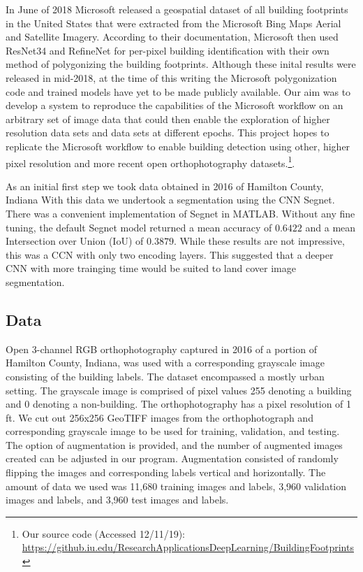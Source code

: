 \documentclass[acmtog, authorversion]{acmart}
\begin{document}
In June of 2018 Microsoft released a geospatial dataset of all building footprints in the United States that were extracted from the Microsoft Bing Maps Aerial and Satellite Imagery\cite{Microsoft2019}. According to their documentation, Microsoft then used ResNet34 and RefineNet for per-pixel building identification with their own method of polygonizing the building footprints. Although these inital results were released in mid-2018, at the time of this writing the Microsoft polygonization code and trained models have yet to be made publicly available. Our aim was to develop a system to reproduce the capabilities of the Microsoft workflow on an arbitrary set of image data that could then enable the exploration of higher resolution data sets and data sets at different epochs. This project hopes to replicate the Microsoft workflow to enable building detection using other, higher pixel resolution and more recent open orthophotography datasets.\footnote{Our source code (Accessed 12/11/19):\\ \url{https://github.iu.edu/ResearchApplicationsDeepLearning/BuildingFootprints}}.


As an initial first step we took data obtained in 2016 of Hamilton County, Indiana 
With this data we undertook a segmentation using the CNN Segnet. There was a convenient implementation of Segnet in MATLAB. Without any fine tuning, the default Segnet model returned a mean accuracy of $0.6422$ and a mean Intersection over Union (IoU) of $0.3879$. While these results are not impressive, this was a CCN with only two encoding layers. This suggested that a deeper CNN with more trainging time would be suited to land cover image segmentation.

\subsection{Data}
 Open 3-channel RGB orthophotography captured in 2016 of a portion of Hamilton County, Indiana, was used with a corresponding grayscale image consisting of the building labels. The dataset encompassed a mostly urban setting. The grayscale image is comprised of pixel values 255 denoting a building and 0 denoting a non-building. The orthophotography has a pixel resolution of 1 ft. We cut out 256x256 GeoTIFF images from the orthophotograph and corresponding grayscale image to be used for training, validation, and testing. The option of augmentation is provided, and the number of augmented images created can be adjusted in our program. Augmentation consisted of randomly flipping the images and corresponding labels vertical and horizontally. The amount of data we used was 11,680 training images and labels, 3,960 validation images and labels, and 3,960 test images and labels.
\end{document}
